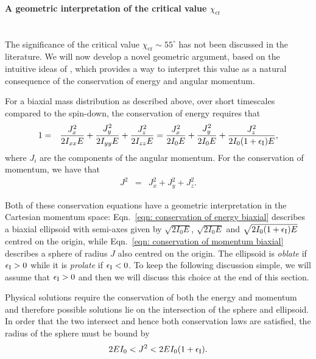 \documentclass[../full_thesis/full_thesis.tex]{subfiles}
\begin{document}
\clearpage
\paragraph{A geometric interpretation of the critical value $\chi_\textrm{cr}$}\mbox{}\\
The significance of the critical value $\chi_\textrm{cr} \sim 55^{\circ}$
has not been discussed in the literature. We will now develop a novel
geometric argument, based on the intuitive ideas of \citet{Landau1969},
which provides a way to interpret this value as a natural
consequence of the conservation of energy and angular momentum.

For a biaxial mass distribution as described above, over short timescales compared
to the spin-down, the conservation of energy requires that
\begin{eqnarray}
1 & = & \frac{J_{x}^{2}}{2I_{xx}E}+\frac{J_{y}^{2}}{2I_{yy}E}+\frac{J_{z}^{2}}{2I_{zz}E}
=\frac{J_{x}^{2}}{2I_{0}E}+\frac{J_{y}^{2}}{2I_{0}E}+\frac{J_{z}^{2}}{2I_{0}(1+\epsilon_{\mathrm{I}})E},
\label{eqn: conservation of energy biaxial}
\end{eqnarray}
where $J_i$ are the components of the angular momentum. For the conservation of
momentum, we have that
\begin{eqnarray}
J^{2} & = & J_{x}^{2}+J_{y}^{2}+J_{z}^{2}.
\label{eqn: conservation of momentum biaxial}
\end{eqnarray}

Both of these conservation equations have a geometric interpretation in the
Cartesian momentum space: Eqn.~\eqref{eqn: conservation of energy biaxial}
describes a biaxial ellipsoid with semi-axes given by $\sqrt{2I_{0}E}$,
$\sqrt{2I_{0}E}$ and $\sqrt{2I_{0}(1+\epsilon_{\mathrm{I}})E}$ centred on the origin,
while Eqn.~\eqref{eqn: conservation of momentum biaxial} describes a sphere of
radius $J$ also centred on the origin. The ellipsoid is \emph{oblate} if $\epsilon_{\mathrm{I}}
> 0$ while it is \emph{prolate} if $\epsilon_{\mathrm{I}} < 0$. To keep the following discussion
simple, we will assume that $\epsilon_{\mathrm{I}} > 0$ and then we will discuss this choice at
the end of this section.

Physical solutions require the conservation of both
the energy and momentum and therefore possible solutions lie on the intersection
of the sphere and ellipsoid. In order that the two intersect and hence both
conservation laws are satisfied, the radius of the sphere must be bound by
\begin{equation}
2EI_{0}<J^{2}<2EI_{0}(1+\epsilon_{\mathrm{I}}).
\label{eqn: orderings}
\end{equation}
\end{document}
